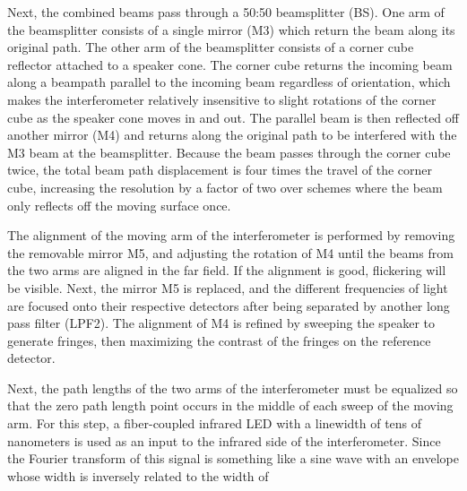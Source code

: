 \documentclass[12pt]{puthesis}
\begin{document}
Next, the combined beams pass through a 50:50 beamsplitter (BS). One arm of the beamsplitter consists of a single mirror (M3) which return the beam along its original path. The other arm of the beamsplitter consists of a corner cube reflector attached to a speaker cone. The corner cube returns the incoming beam along a beampath parallel to the incoming beam regardless of orientation, which makes the interferometer relatively insensitive to slight rotations of the corner cube as the speaker cone moves in and out. The parallel beam is then reflected off another mirror (M4) and returns along the original path to be interfered with the M3 beam at the beamsplitter. Because the beam passes through the corner cube twice, the total beam path displacement is four times the travel of the corner cube, increasing the resolution by a factor of two over schemes where the beam only reflects off the moving surface once.

The alignment of the moving arm of the interferometer is performed by removing the removable mirror M5, and adjusting the rotation of M4 until the beams from the two arms are aligned in the far field. If the alignment is good, flickering will be visible. Next, the mirror M5 is replaced, and the different frequencies of light are focused onto their respective detectors after being separated by another long pass filter (LPF2). The alignment of M4 is refined by sweeping the speaker to generate fringes, then maximizing the contrast of the fringes on the reference detector.

Next, the path lengths of the two arms of the interferometer must be equalized so that the zero path length point occurs in the middle of each sweep of the moving arm. For this step, a fiber-coupled infrared LED with a linewidth of tens of nanometers is used as an input to the infrared side of the interferometer. Since the Fourier transform of this signal is something like a sine wave with an envelope whose width is inversely related to the width of 




\end{document}
